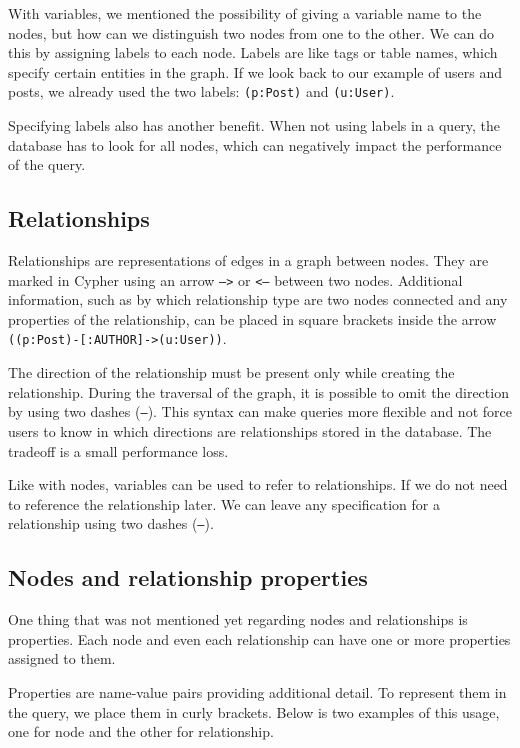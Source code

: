 With variables, we mentioned the possibility of giving a variable name to the nodes, but how can we distinguish two nodes from one to the other.
We can do this by assigning labels to each node. Labels are like tags or table names, which specify certain entities in the graph.
If we look back to our example of users and posts, we already used the two labels: \texttt{(p:Post)} and \texttt{(u:User)}.

Specifying labels also has another benefit. When not using labels in a query, the database has to look for all nodes, which can negatively impact the performance of the query.
\cite{noauthor_getting_nodate}

\subsection{Relationships}

Relationships are representations of edges in a graph between nodes.
They are marked in Cypher using an arrow \texttt{-->} or \texttt{<--} between two nodes.
Additional information, such as by which relationship type are two nodes connected and any properties of the relationship, can be placed in square brackets inside the arrow \texttt{((p:Post)-[:AUTHOR]->(u:User))}. \cite{noauthor_getting_nodate}

The direction of the relationship must be present only while creating the relationship.
During the traversal of the graph, it is possible to omit the direction by using two dashes (\texttt{--}).
This syntax can make queries more flexible and not force users to know in which directions are relationships stored in the database.
The tradeoff is a small performance loss.

Like with nodes, variables can be used to refer to relationships.
If we do not need to reference the relationship later. We can leave any specification for a relationship using two dashes (\texttt{--}).

\subsection{Nodes and relationship properties}

One thing that was not mentioned yet regarding nodes and relationships is properties. Each node and even each relationship can have one or more properties assigned to them.

Properties are name-value pairs providing additional detail. To represent them in the query, we place them in curly brackets. \cite{noauthor_getting_nodate}
Below is two examples of this usage, one for node and the other for relationship.

